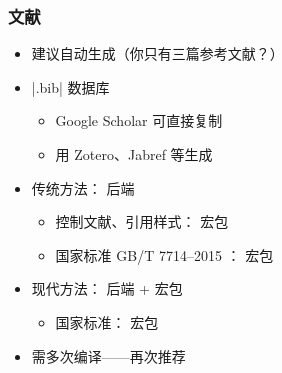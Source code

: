 \begin{frame}[fragile]
\frametitle{文献}
\begin{itemize}
  \item 建议自动生成\pause （你只有三篇参考文献？）\pause
  \item |.bib| 数据库
    \begin{itemize}
      \item Google Scholar 可直接复制
      \item 用 Zotero、Jabref 等生成
    \end{itemize} \pause
  \item 传统方法：\BibTeX{} 后端
    \begin{itemize}
      \item 控制文献、引用样式： 宏包
      \item 国家标准 GB/T 7714--2015
            ：
            \alert{ 宏包}
    \end{itemize} \pause
  \item 现代方法： 后端 +  宏包
    \begin{itemize}
      \item 国家标准： 宏包
    \end{itemize} \pause
  \item 需多次编译——再次推荐 
\end{itemize}
\end{frame}

